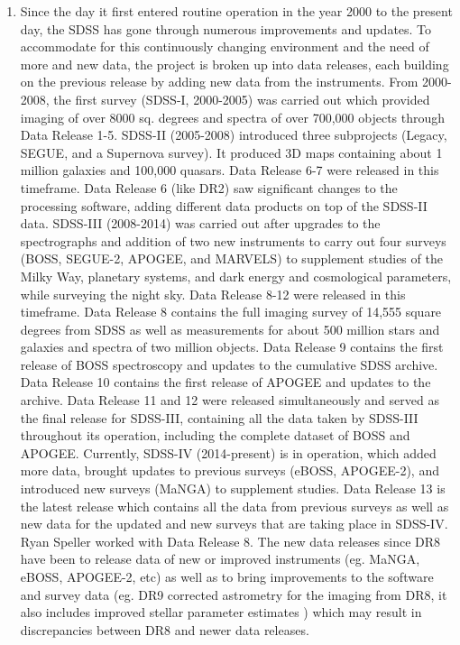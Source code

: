 \documentclass[10pt,letterpaper]{article}
\begin{document}
\begin{enumerate}
\item Since the day it first entered routine operation in the year 2000 to the present day, the SDSS has gone through numerous improvements and updates. To accommodate for this continuously changing environment and the need of more and new data, the project is broken up into data releases, each building on the previous release by adding new data from the instruments. From 2000-2008, the first survey (SDSS-I, 2000-2005) was carried out which provided imaging of over 8000 sq. degrees and spectra of over 700,000 objects through Data Release 1-5. SDSS-II (2005-2008) introduced three subprojects (Legacy, SEGUE, and a Supernova survey). It produced 3D maps containing about 1 million galaxies and 100,000 quasars. Data Release 6-7 were released in this timeframe. Data Release 6 (like DR2) saw significant changes to the processing software, adding different data products on top of the SDSS-II data.\cite{classic SDSS} SDSS-III (2008-2014) was carried out after upgrades to the spectrographs and addition of two new instruments to carry out four surveys (BOSS, SEGUE-2, APOGEE, and MARVELS) to supplement studies of the Milky Way, planetary systems, and dark energy and cosmological parameters, while surveying the night sky. Data Release 8-12 were released in this timeframe. Data Release 8 contains the full imaging survey of 14,555 square degrees from SDSS as well as measurements for about 500 million stars and galaxies and spectra of two million objects. Data Release 9 contains the first release of BOSS spectroscopy and updates to the cumulative SDSS archive. Data Release 10 contains the first release of APOGEE and updates to the archive. Data Release 11 and 12 were released simultaneously and served as the final release for SDSS-III, containing all the data taken by SDSS-III throughout its operation, including the complete dataset of BOSS and APOGEE.\cite{SDSS-III} Currently, SDSS-IV (2014-present) is in operation, which added more data, brought updates to previous surveys (eBOSS, APOGEE-2), and introduced new surveys (MaNGA) to supplement studies. Data Release 13 is the latest release which contains all the data from previous surveys as well as new data for the updated and new surveys that are taking place in SDSS-IV.\cite{SDSS webpage} Ryan Speller worked with Data Release 8. The new data releases since DR8 have been to release data of new or improved instruments (eg. MaNGA, eBOSS, APOGEE-2, etc) as well as to bring improvements to the software and survey data (eg. DR9 corrected astrometry for the imaging from DR8, it also includes improved stellar parameter estimates \cite{DR9}) which may result in discrepancies between DR8 and newer data releases.


\end{enumerate}
\end{document}
